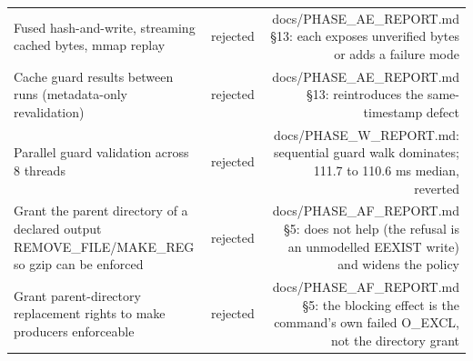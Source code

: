 \begin{table}[t]
\begin{tabular}{lrr}
Fused hash-and-write, streaming cached bytes, mmap replay & rejected & docs/PHASE\_AE\_REPORT.md §13: each exposes unverified bytes or adds a failure mode \\
Cache guard results between runs (metadata-only revalidation) & rejected & docs/PHASE\_AE\_REPORT.md §13: reintroduces the same-timestamp defect \\
Parallel guard validation across 8 threads & rejected & docs/PHASE\_W\_REPORT.md: sequential guard walk dominates; 111.7 to 110.6 ms median, reverted \\
Grant the parent directory of a declared output REMOVE\_FILE/MAKE\_REG so gzip can be enforced & rejected & docs/PHASE\_AF\_REPORT.md §5: does not help (the refusal is an unmodelled EEXIST write) and widens the policy \\
Grant parent-directory replacement rights to make producers enforceable & rejected & docs/PHASE\_AF\_REPORT.md §5: the blocking effect is the command's own failed O\_EXCL, not the directory grant \\
\bottomrule
\end{tabular}
\end{table}
